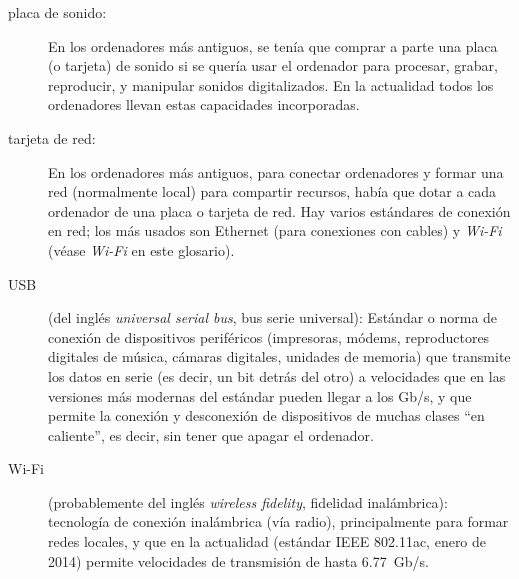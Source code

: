 \begin{description}
\item[placa de sonido:] En los ordenadores más antiguos, se tenía que comprar a parte una placa (o tarjeta) de sonido si se quería usar el ordenador para procesar, grabar, reproducir, y manipular sonidos digitalizados. En la actualidad todos los ordenadores llevan estas capacidades incorporadas. 

\item[tarjeta de red:] En los ordenadores más antiguos, para conectar ordenadores y formar una red (normalmente local) para compartir recursos, había que dotar a cada ordenador de una placa o tarjeta de red. Hay varios estándares de conexión en red; los más usados son Ethernet (para conexiones con cables) y \emph{Wi-Fi} (véase \emph{Wi-Fi} en este glosario). 

\item[USB] (del inglés \emph{universal serial bus}, bus serie universal): Estándar o norma de conexión de dispositivos periféricos (impresoras, módems, reproductores digitales de música, cámaras digitales, unidades de memoria) que transmite los datos en serie (es decir, un bit detrás del otro) a velocidades que en las versiones más modernas del estándar pueden llegar a los Gb/s, y que permite la conexión y desconexión de dispositivos de muchas clases ``en caliente'', es decir, sin tener que apagar el ordenador. 

\item[Wi-Fi] (probablemente del inglés \emph{wireless fidelity}, fidelidad inalámbrica): tecnología de conexión inalámbrica (vía radio), principalmente para formar redes locales, y que en la actualidad (estándar IEEE 802.11ac, enero de 2014) permite velocidades de transmisión de hasta 6.77~Gb/s. \end{description} 

